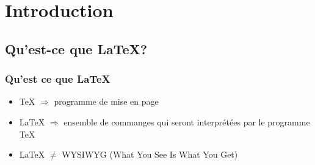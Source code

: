 \documentclass[10pt,svgnames,usenames,table]{beamer} %
\begin{document}

\section{Introduction}
\subsection{Qu'est-ce que \LaTeX{}?}
\begin{frame}
\frametitle{Qu'est ce que \LaTeX}

\begin{itemize}
\item \TeX{} $ \Rightarrow$ programme de mise en page
\vspace{0.5cm}
\item \LaTeX{} $ \Rightarrow$ ensemble de commanges qui seront
 interprétées par le programme \TeX
 \vspace{0.5cm}
\item \LaTeX{} $ \neq$ WYSIWYG (What You See Is What You Get)
\end{itemize}

\end{frame}
\end{document}
